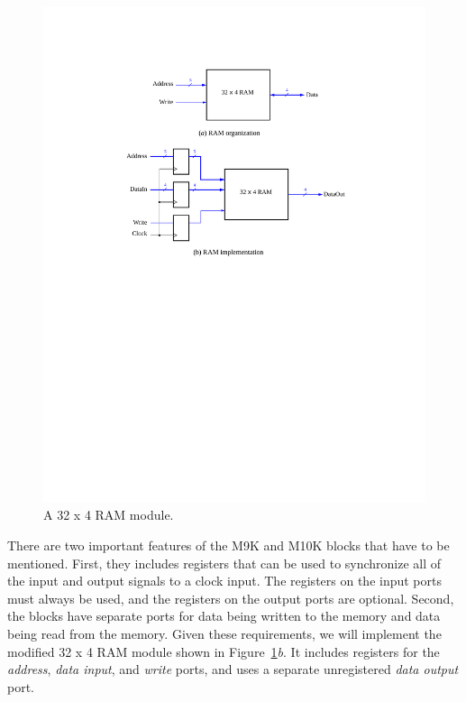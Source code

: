 \documentclass[epsfig,10pt,fullpage]{article}
\begin{document}
\begin{figure}[H]
	\begin{center}
		\includegraphics[]{figures/figure1.pdf}
	\end{center}
	\caption{A 32 {\sf x} 4 RAM module.}
	\label{fig:fig1}
\end{figure}

There are two important features of the M9K and M10K blocks that have to be mentioned.
First, they includes registers that can be used to synchronize all of the 
input and output signals to a clock input. The registers on the input ports must always be
used, and the registers on the output ports are optional.  Second, the blocks have separate
ports for data being written to the memory and data being read from the memory. 
Given these requirements, we will implement the modified 32 {\sf x} 4 RAM module shown in 
Figure~\ref{fig:fig1}{\it b}. It includes registers for the {\it address}, {\it data input}, 
and {\it write} ports, and uses a separate unregistered {\it data output} port.
\end{document}
